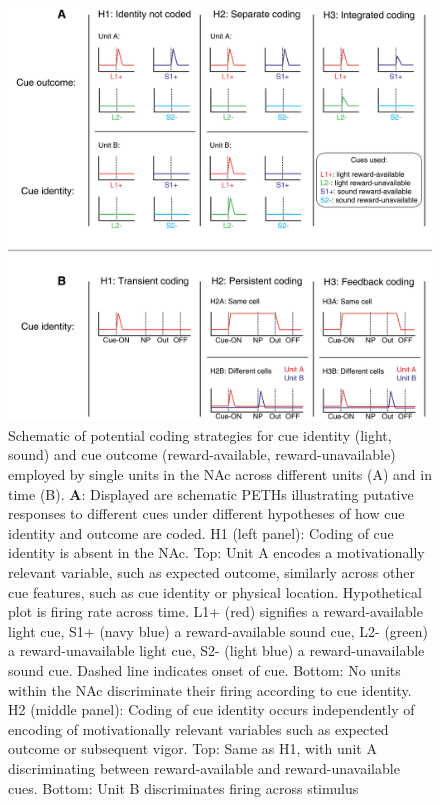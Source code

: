\documentclass[11pt]{article}
\newcommand{\bsf}[1]{\textbf{#1}}
\begin{document}
\begin{figure}[h]
\centering
\includegraphics[height=0.5\textheight]{Fig 1 - Schematic neural.png}
\caption{Schematic of potential coding strategies for cue identity
  (light, sound) and cue outcome (reward-available,
  reward-unavailable) employed by single units in the NAc across
  different units (A) and in time (B). \bsf{A}: Displayed are
  schematic PETHs illustrating putative responses to different cues
  under different hypotheses of how cue identity and outcome are
  coded. H1 (left panel): Coding of cue identity is absent in the
  NAc. Top: Unit A encodes a motivationally relevant variable, such as
  expected outcome, similarly across other cue features, such as cue
  identity or physical location. Hypothetical plot is firing rate
  across time. L1+ (red) signifies a reward-available light cue, S1+
  (navy blue) a reward-available sound cue, L2- (green) a
  reward-unavailable light cue, S2- (light blue) a reward-unavailable
  sound cue. Dashed line indicates onset of cue. Bottom: No units
  within the NAc discriminate their firing according to cue
  identity. H2 (middle panel): Coding of cue identity occurs
  independently of encoding of motivationally relevant variables such
  as expected outcome or subsequent vigor. Top: Same as H1, with unit
  A discriminating between reward-available and reward-unavailable
  cues. Bottom: Unit B discriminates firing across stimulus
}
\end{figure}
\end{document}
